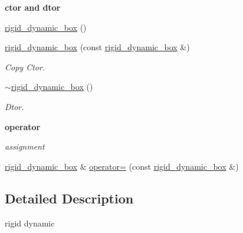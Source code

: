 \begin{Indent}{\bf ctor and dtor}\par
{\em \label{_amgrp98fbd3e5ae66fcd014fb744fec76c58d}
 }\begin{DoxyCompactItemize}
\item 
\hyperlink{classnebula_1_1content_1_1actor_1_1physics_1_1physx_1_1rigid__dynamic__box_a4adba810efcc2667c97f952f98d665c5}{rigid\_\-dynamic\_\-box} ()
\item 
\hyperlink{classnebula_1_1content_1_1actor_1_1physics_1_1physx_1_1rigid__dynamic__box_a7173dc758506932a6ebbb43d15c73eb2}{rigid\_\-dynamic\_\-box} (const \hyperlink{classnebula_1_1content_1_1actor_1_1physics_1_1physx_1_1rigid__dynamic__box}{rigid\_\-dynamic\_\-box} \&)
\begin{DoxyCompactList}\small\item\em Copy Ctor. \item\end{DoxyCompactList}\item 
\hyperlink{classnebula_1_1content_1_1actor_1_1physics_1_1physx_1_1rigid__dynamic__box_a3e604bf19394636926455f65b812543a}{$\sim$rigid\_\-dynamic\_\-box} ()
\begin{DoxyCompactList}\small\item\em Dtor. \item\end{DoxyCompactList}\end{DoxyCompactItemize}
\end{Indent}
\begin{Indent}{\bf operator}\par
{\em \label{_amgrp4b583376b2767b923c3e1da60d10de59}
 assignment }\begin{DoxyCompactItemize}
\item 
\hyperlink{classnebula_1_1content_1_1actor_1_1physics_1_1physx_1_1rigid__dynamic__box}{rigid\_\-dynamic\_\-box} \& \hyperlink{classnebula_1_1content_1_1actor_1_1physics_1_1physx_1_1rigid__dynamic__box_a46578408f7f93646a86924261dbb8442}{operator=} (const \hyperlink{classnebula_1_1content_1_1actor_1_1physics_1_1physx_1_1rigid__dynamic__box}{rigid\_\-dynamic\_\-box} \&)
\end{DoxyCompactItemize}
\end{Indent}


\subsection{Detailed Description}
rigid dynamic 

